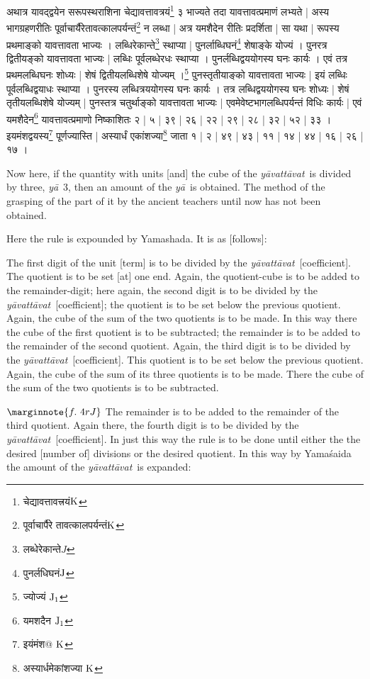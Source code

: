 \documentclass[11pt,a5paper]{book}
\def\yavattavat{\textit{y\=avatt\=avat}}
\def\ya{\textit{y\=a}}
\begin{document}
\newpage 
{\s अथात्र यावद्द्वयेन सरूपस्थराशिना
चेद्यावत्तावत्रयं\footnote{{\s चेद्यावत्तावत्त्रयं}${\rm K}$}
३ भाज्यते
तदा यावत्तावत्प्रमाणं लभ्यते |
अस्य भागग्रहणरीतिः पूर्वाचार्यैरेतावत्कालपर्यन्तं\footnote{{\s पूर्वाचार्पैरे तावत्कालपर्यन्तं}${\rm K}$}
न लब्धा |
अत्र यमशैदेन रीतिः प्रदर्शिता | 
सा यथा | 
रूपस्य प्रथमाङ्को यावत्तावता भाज्यः । लब्धिरेकान्ते\footnote{{\s लब्धेरेकान्ते}$J$}
स्थाप्या | 
पुनर्लाब्धिघनं\footnote{{\s पुनर्लधिघनं}${\rm J}$} शेषाङ्के योज्यं । पुनरत्र
द्वितीयङ्को 
यावत्तावता भाज्यः |
लब्धिः पूर्वलब्धेरधः स्थाप्या । 
पुनर्लब्धिद्वययोगस्य घनः कार्यः । 
एवं तत्र प्रथमलब्धिघनः शोध्यः | 
शेषं द्वितीयलब्धिशेषे योज्यम् ।\footnote{{\s ज्योज्यं }${\rm J_1}$}
पुनस्तृतीयाङ्को यावत्तावता भाज्यः | 
इयं लब्धिः पूर्वलब्धिद्वयाधः स्थाप्या । 
पुनरस्य लब्धित्रययोगस्य घनः कार्यः । 
तत्र लब्धिद्वययोगस्य घनः शोध्यः | 
शेषं तृतीयलब्धिशेषे योज्यम् | 
पुनस्तत्र चतुर्थाङ्को यावत्तावता भाज्यः | 
एवमेवेष्टभागलब्धिपर्यन्तं विधिः कार्यः | 
एवं यमशैदेन\footnote{{\s यमशदैन }${\rm J_1}$}
यावत्तावत्प्रमाणो निष्काशितः २ | ५ | ३९ | २६ | २२ | २९ | २८ | ३२ | ५२ | ३३ ।
इयमंशद्वयस्य\footnote{{\s इयंमंश@ }${\rm K}$}
पूर्णज्यास्ति | 
अस्यार्धं एकांशज्या\footnote{{\s अस्यार्धमेकांशज्या }${\rm K}$} जाता १ | २ | ४९ | ४३ | ११ | १४ | ४४ | १६ | २६ | १७ । }


\newpage 
Now here, if the quantity with units [and] the cube of the \yavattavat\ is divided by three, \ya\ 3, 
then an amount of the \ya\ is obtained.    
The method of the grasping of the part of it 
by the ancient teachers until now has not been obtained.

Here the rule is expounded by Yamashada. It is as [follows]:

The first digit of the unit [term] is to be divided by the \yavattavat\ [coefficient]. The quotient is to be set
[at] one end. Again, the quotient-cube is to be added to the remainder-digit;
here again, the second digit is to be divided by the \yavattavat\ [coefficient]; the quotient is to be set
below the previous quotient. Again, the cube of the sum of the two quotients
is to be made.  In this way there the cube of the first quotient is to be subtracted;
the remainder is to be added to the remainder of the second quotient. Again, the third digit is to be
divided by the \yavattavat\ [coefficient]. This quotient is to be set below the previous quotient. Again,
the cube of the sum of its three quotients is to be made. There the cube of
the sum of the two quotients is to be subtracted. 

$\marginnote{f.~4r J}$
The remainder is to be added to the remainder of the third quotient. Again there, the 
fourth digit is to be divided by the \yavattavat\ [coefficient]. In just this way the rule is to be done until either the the desired [number of] divisions or the desired quotient. In this way by Yama\'saida the amount of the \yavattavat\ is 
expanded:
\end{document}
